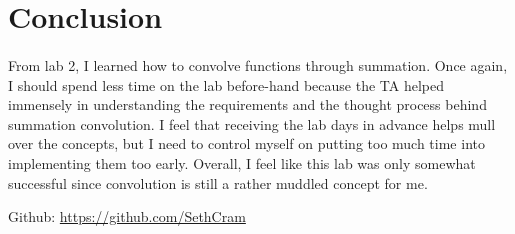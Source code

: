 \documentclass[12pt]{report}
\begin{document}
\section{Conclusion}


    \paragraph{} From lab 2, I learned how to convolve functions through summation. Once again, I should spend less time on the lab before-hand because the TA helped immensely in understanding the requirements and the thought process behind summation convolution. I feel that receiving the lab days in advance helps mull over the concepts, but I need to control myself on putting too much time into implementing them too early. Overall, I feel like this lab was only somewhat successful since convolution is still a rather muddled concept for me. 

Github: \url{https://github.com/SethCram} 

\newpage
\end{document}
